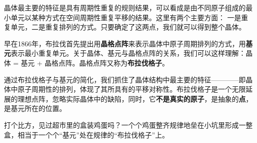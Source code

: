 
晶体最主要的特征是具有周期性重复的规则结果，可以看成是由不同原子组成的最小单元以某种方式在空间周期性重复平移的结果。这里有两个主要方面：
一是重复单元，二是重复排列的方式。只要确定了这两点，我们就可以得到整个晶体。

早在1866年，布拉伐首先提出用\textbf{晶格点阵}来表示晶体中原子周期排列的方式，用\textbf{基元}表示最小重复单元。关于晶体、基元与晶格点阵的关系，我们可以这样理解：晶体 = 基元 + 晶格点阵。晶格点阵又称为\textbf{布拉伐格子}。

通过布拉伐格子与基元的简化，我们抓住了晶体结构中最主要的特征————即晶体中原子周期性的排列，体现了其所具有的平移对称性。布拉伐格子是一个无限延展的理想点阵，忽略实际晶体中的缺陷，同时，它\textbf{不是真实的原子}，是抽象的\textbf{点}，是基元所在的位置。

打个比方，见过超市里的盒装鸡蛋吗？一个个鸡蛋整齐规律地垒在小坑里形成一整盒，相当于一个个“基元”处在规律的“布拉伐格子”上。